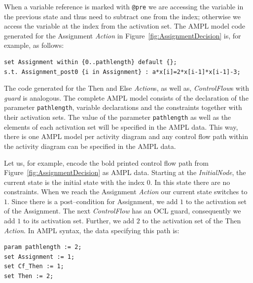 \documentclass[runningheads,a4paper]{llncs}%
\newcommand{\UMLType}[1]{\textsf{\textit{#1}}} %
\newcommand{\UMLReference}[1]{\textsf{\textit{#1}}} %
\newcommand{\AMPLCode}[1]{\texttt{#1}}
\begin{document}
When a variable reference is marked with \verb=@pre= we are accessing the
variable in the previous state and thus need to subtract one from the index;
otherwise we access the variable at the index from the activation set. The AMPL
model code generated for the Assignment \UMLType{Action} in
Figure~\ref{fig:AssignmentDecision} is, for example, as follows:%
\begin{lstlisting}[basicstyle=\ttfamily,language=ampl,breaklines=true]
set Assignment within {0..pathlength} default {};
s.t. Assignment_post0 {i in Assignment} : a*x[i]=2*x[i-1]*x[i-1]-3;
\end{lstlisting}
The code generated for the Then and Else \UMLType{Action}s, as well as,
\UMLType{ControlFlow}s with \UMLReference{guard} is analogous. The complete AMPL
model consists of the declaration of the parameter \AMPLCode{pathlength},
variable declarations and the constraints together with their activation sets.
The value of the parameter \AMPLCode{pathlength} as well as the elements of each
activation set will be specified in the AMPL data. This way, there is one AMPL
model per activity diagram and any control flow path within the activity diagram
can be specified in the AMPL data.

Let us, for example, encode the bold printed control flow path from
Figure~\ref{fig:AssignmentDecision} as AMPL data. Starting at the
\UMLType{InitialNode}, the current state is the initial state with the index
$0$. In this state there are no constraints. When we reach the Assignment
\UMLType{Action} our current state switches to $1$. Since there is a
post--condition for Assignment, we add $1$ to the activation set of the
Assignment. The next \UMLType{ControlFlow} has an OCL guard, consequently we add
$1$ to its activation set. Further, we add $2$ to the activation set of the Then
\UMLType{Action}. In AMPL syntax, the data specifying this path is:%
\begin{lstlisting}[basicstyle=\ttfamily,language=ampl]
param pathlength := 2;
set Assignment := 1;
set Cf_Then := 1;
set Then := 2;
\end{lstlisting}%
%
\end{document}
